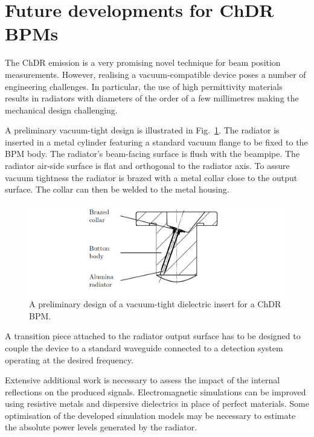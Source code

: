 
\newpage



\section[Future developments for ChDR BPMs]{Future developments for ChDR BPMs}\label{sec:fd_chBPM}

The ChDR emission is a very promising novel technique for beam position measurements. However, realising a vacuum-compatible device poses a number of engineering challenges. In particular, the use of high permittivity materials results in radiators with diameters of the order of a few millimetres making the mechanical design challenging.

A preliminary vacuum-tight design is illustrated in Fig.~\ref{fig:new_button}. The radiator is inserted in a metal cylinder featuring a standard vacuum flange to be fixed to the BPM body. The radiator's beam-facing surface is flush with the beampipe. The radiator air-side surface is flat and orthogonal to the radiator axis. To assure vacuum tightness the radiator is brazed with a metal collar close to the output surface. The collar can then be welded to the metal housing. 


\begin{figure}[!b]
\centering
\includegraphics[width=14cm, keepaspectratio]{pictures/button_detail}
\caption{A preliminary design of a vacuum-tight dielectric insert for a ChDR BPM.}
\label{fig:new_button}
\end{figure}

A transition piece attached to the radiator output surface has to be designed to couple the device to a standard waveguide connected to a detection system operating at the desired frequency. 

Extensive additional work is necessary to assess the impact of the internal reflections on the produced signals. Electromagnetic simulations can be improved using resistive metals and dispersive dielectrics in place of perfect materials. Some optimisation of the developed simulation models may be necessary to estimate the absolute power levels generated by the radiator.



